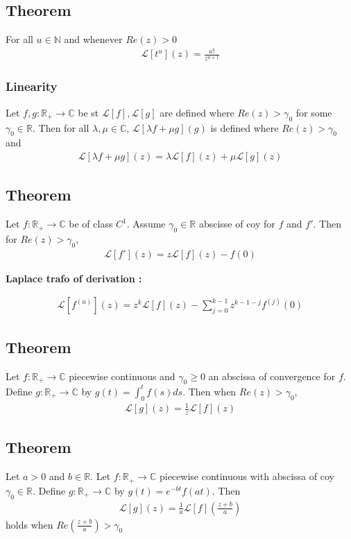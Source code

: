 \subsection{Theorem}
For all $u \in \mathbb{N}$ and whenever $Re(z) > 0$
\begin{align*}
    \mathcal{L}[t^u](z) = \frac{u!}{z^{u+1}}
\end{align*}
\subsubsection{Linearity}
Let $f,g: \mathbb{R}_+ \rightarrow \mathbb{C}$ be st $\mathcal{L}[f], \mathcal{L}[g]$ are defined where $Re(z) > \gamma_0$ for some $\gamma_0 \in \mathbb{R}$. Then for all $\lambda, \mu \in \mathbb{C}$, $\mathcal{L}[\lambda f + \mu g](g)$ is defined where $Re(z) > \gamma_0$ and 
\begin{align*}
    \mathcal{L}[\lambda f + \mu g](z) = \lambda \mathcal{L}[f](z) + \mu \mathcal{L}[g](z)
\end{align*}
\subsection{Theorem}
Let $f: \mathbb{R}_+ \rightarrow \mathbb{C}$ be of class $C^1$. Assume $\gamma_0 \in \mathbb{R}$ abscisse of coy for $f$ and $f'$. Then for $Re(z) > \gamma_0$,
\begin{align*}
    \mathcal{L}[f'](z) = z \mathcal{L}[f](z) -f(0)
\end{align*}

\textbf{Laplace trafo of derivation : }

\begin{align*}
    \mathcal{L}[f^{(u)}](z) = z^k \mathcal{L}[f](z) - \sum_{j=0}^{k-1}z^{k-1-j}f^{(j)}(0)
\end{align*}
\subsection{Theorem}
Let $f: \mathbb{R}_+ \rightarrow \mathbb{C}$ piecewise continuous and $\gamma_0 \geq 0$ an abscissa of convergence for $f$. Define $g: \mathbb{R}_+ \rightarrow \mathbb{C}$ by $g(t) = \int_0^tf(s)ds$. Then when $Re(z) > \gamma_0$, 
\begin{align*}
    \mathcal{L}[g](z) = \frac{1}{z}\mathcal{L}[f](z)
\end{align*}

\subsection{Theorem}
Let $a>0$ and $b \in \mathbb{R}$. Let $f: \mathbb{R}_+ \rightarrow \mathbb{C}$ piecewise continuous with abscissa of coy $\gamma_0 \in \mathbb{R}$. Define $g: \mathbb{R}_+ \rightarrow \mathbb{C}$ by $g(t) = e^{-bt}f(at)$. Then
\begin{align*}
    \mathcal{L}[g](z) = \frac{1}{a}\mathcal{L}[f] (\frac{z+b}{a})
\end{align*}
holds when $Re(\frac{z+b}{a}) > \gamma_0$

